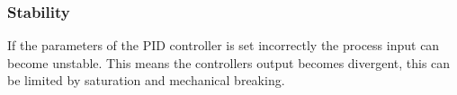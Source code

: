 \subsubsection {Stability} 

If the parameters of the PID controller is set incorrectly the process input can become unstable.
This means the controllers output becomes divergent, this can be limited by saturation and mechanical breaking.
